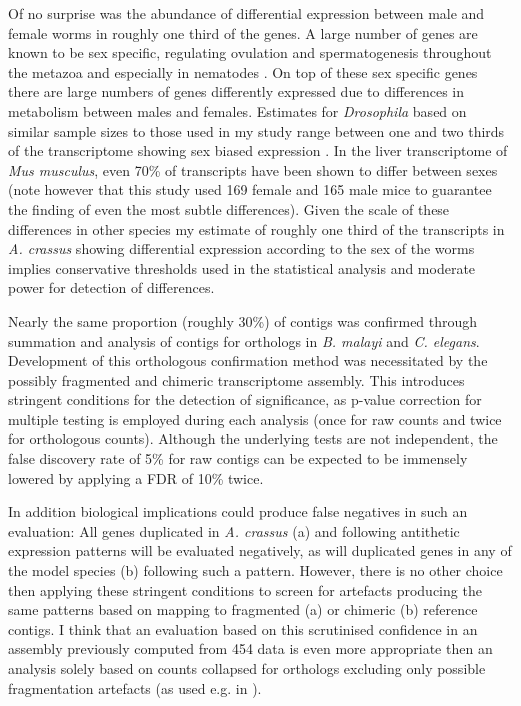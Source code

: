 \documentclass[10pt]{article}
\begin{document}
Of no surprise was the abundance of differential expression between
male and female worms in roughly one third of the genes. A large
number of genes are known to be sex specific, regulating ovulation and
spermatogenesis throughout the metazoa and especially in nematodes
\cite{pmid15371532}. On top of these sex specific genes there are
large numbers of genes differently expressed due to differences in
metabolism between males and females. Estimates for
\textit{Drosophila} based on similar sample sizes to those used in my
study range between one and two thirds of the transcriptome showing
sex biased expression \cite{pmid11726925}. In the liver transcriptome
of \textit{Mus musculus}, even 70\% of transcripts have been shown to
differ between sexes \cite{pmid16825664} (note however that this study
used 169 female and 165 male mice to guarantee the finding of even the
most subtle differences). Given the scale of these differences in
other species my estimate of roughly one third of the transcripts in
\textit{A. crassus} showing differential expression according to the
sex of the worms implies conservative thresholds used in the
statistical analysis and moderate power for detection of differences.

Nearly the same proportion (roughly 30\%) of contigs was confirmed
through summation and analysis of contigs for orthologs in
\textit{B. malayi} and \textit{C. elegans}. Development of this
orthologous confirmation method was necessitated by the possibly
fragmented and chimeric transcriptome assembly. This introduces
stringent conditions for the detection of significance, as p-value
correction for multiple testing is employed during each analysis (once
for raw counts and twice for orthologous counts). Although the
underlying tests are not independent, the false discovery rate of 5\%
for raw contigs can be expected to be immensely lowered by applying a
FDR of 10\% twice.

In addition biological implications could produce false negatives in
such an evaluation: All genes duplicated in \textit{A. crassus} (a)
and following antithetic expression patterns will be evaluated
negatively, as will duplicated genes in any of the model species (b)
following such a pattern. However, there is no other choice then
applying these stringent conditions to screen for artefacts producing
the same patterns based on mapping to fragmented (a) or chimeric (b)
reference contigs. I think that an evaluation based on this
scrutinised confidence in an assembly previously computed from 454
data is even more appropriate then an analysis solely based on counts
collapsed for orthologs excluding only possible fragmentation
artefacts (as used e.g. in \cite{pmid22084086}).
\end{document}
